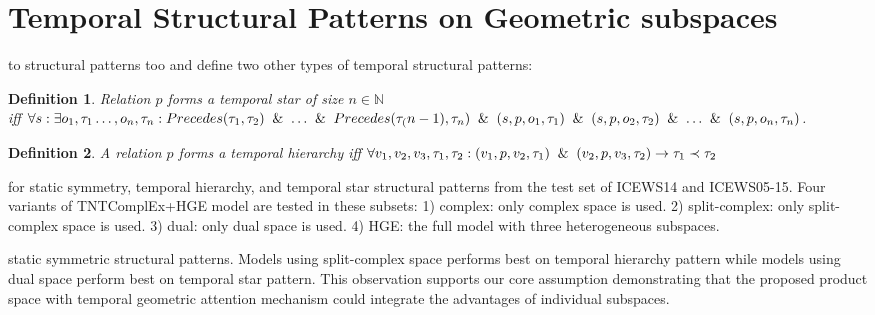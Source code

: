 \documentclass[letterpaper]{article} %
\newtheorem{definition}{Definition}
\begin{document}
\section{Temporal Structural Patterns on Geometric subspaces}
 to structural patterns too and define two other types of temporal structural patterns:
\begin{definition}
Relation $p$ forms a temporal star of size $n\in\mathbb{N}$\\
iff $\forall s: \exists o_1,\tau_1 \ldots,
 o_n, \tau_n: Precedes(\tau_1, \tau_2) \And \ldots \And Precedes(\tau_(n-1), \tau_n) \And (s,p, o_1, \tau_1) \And (s,p, o_2, \tau_2) \And \ldots \And (s,p, o_n, \tau_n)$.
\end{definition}

\label{sec:structural_pattern_analysis}
\begin{definition}\label{temphierarchy}
A relation $p$ forms a temporal hierarchy iff $\forall v_1, v_2, v_3, \tau_1, \tau_2: (v_1,p,v_2,\tau_1)\And (v_2,p,v_3,\tau_2) \rightarrow \tau_1 \prec \tau_2
$
\end{definition}


 for static symmetry, temporal hierarchy, and temporal star structural patterns from the test set of ICEWS14 and ICEWS05-15. Four variants of TNTComplEx+HGE model are tested in these subsets: 1) complex: only complex space is used. 2) split-complex: only split-complex space is used. 3) dual: only dual space is used. 4) HGE: the full model with three heterogeneous subspaces.


 static symmetric structural patterns. Models using split-complex space performs best on temporal hierarchy pattern while models using dual space perform best on temporal star pattern. This observation supports our core assumption
 demonstrating that the proposed product space with temporal geometric attention mechanism could integrate the advantages of individual subspaces.
\end{document}
